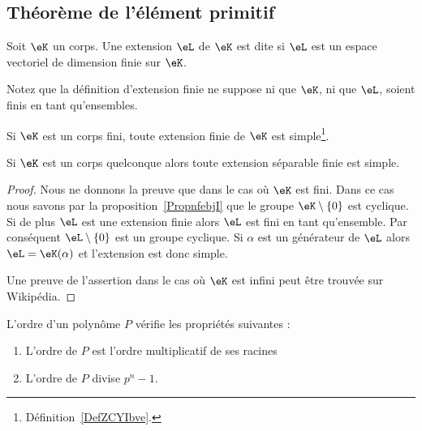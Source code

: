 \subsection{Théorème de l'élément primitif}

\begin{definition}
	Soit \( \eK\) un corps. Une extension \( \eL\) de \( \eK\) est dite  si \( \eL\) est un espace vectoriel de dimension finie sur \( \eK\).
\end{definition}
Notez que la définition d'extension finie ne suppose ni que \( \eK\), ni que \( \eL\), soient finis en tant qu'ensembles.

\begin{theorem}		\label{THOooYFLZooHYENKp}
	\begin{description}
		\item
		      Si \( \eK\) est un corps fini, toute extension finie de \( \eK\) est simple\footnote{Définition~\ref{DefZCYIbve}.}.
		\item
		      Si \( \eK\) est un corps quelconque alors toute extension séparable finie est simple.
	\end{description}
\end{theorem}

\begin{proof}
	Nous ne donnons la preuve que dans le cas où \( \eK\) est fini. Dans ce cas nous savons par la proposition~\ref{PropnfebjI} que le groupe \( \eK\setminus\{ 0 \}\) est cyclique. Si de plus \( \eL\) est une extension finie alors \( \eL\) est fini en tant qu'ensemble. Par conséquent \( \eL\setminus\{ 0 \}\) est un groupe cyclique. Si \( \alpha\) est un générateur de \( \eL\) alors \( \eL=\eK(\alpha)\) et l'extension est donc simple.

	Une preuve de l'assertion dans le cas où \( \eK\) est infini peut être trouvée sur Wikipédia.
\end{proof}

\begin{proposition}		\label{PROPooWNHYooSzMJqF}
	L'ordre d'un polynôme \( P\) vérifie les propriétés suivantes :
	\begin{enumerate}
		\item
		      L'ordre de \( P\) est l'ordre multiplicatif de ses racines
		\item
		      L'ordre de \( P\) divise \( p^n-1\).
	\end{enumerate}
\end{proposition}

